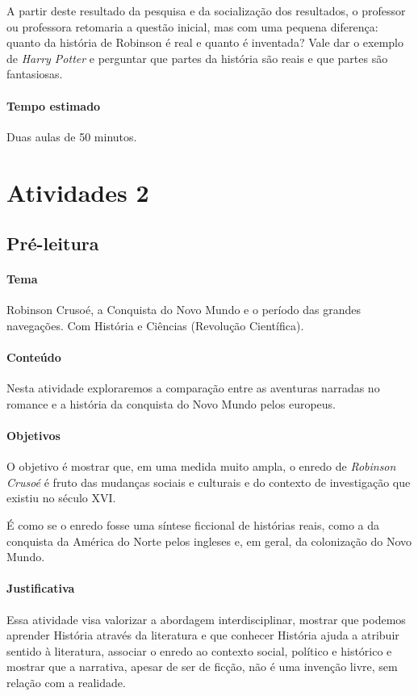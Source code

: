 \documentclass[12pt]{extarticle}
\begin{document}
A partir deste resultado da pesquisa e da socialização dos resultados, o
professor ou professora retomaria a questão inicial, mas com uma pequena
diferença: quanto da história de Robinson é real e quanto é inventada? Vale dar o exemplo de \emph{Harry Potter} e perguntar que partes da
história são reais e que partes são fantasiosas.

\paragraph{Tempo estimado} Duas aulas de 50 minutos.

\section{Atividades 2}

\subsection{Pré-leitura}

\paragraph{Tema} Robinson Crusoé, a Conquista do Novo Mundo e o período das
grandes navegações. Com História e Ciências (Revolução Científica).


\paragraph{Conteúdo}
Nesta atividade exploraremos a comparação entre as aventuras narradas no
romance e a história da conquista do Novo Mundo pelos europeus.

\paragraph{Objetivos}
O objetivo é mostrar que, em uma medida muito ampla, o enredo de
\emph{Robinson Crusoé} é fruto das mudanças sociais e culturais e do
contexto de investigação que existiu no século XVI.

É como se o enredo fosse uma síntese ficcional de histórias reais, como
a da conquista da América do Norte pelos ingleses e, em geral, da
colonização do Novo Mundo.

\paragraph{Justificativa}
Essa atividade visa valorizar a abordagem interdisciplinar, mostrar que
podemos aprender História através da literatura e que conhecer História
ajuda a atribuir sentido à literatura, associar o enredo ao contexto
social, político e histórico e mostrar que a narrativa, apesar de ser de
ficção, não é uma invenção livre, sem relação com a realidade.
\end{document}
